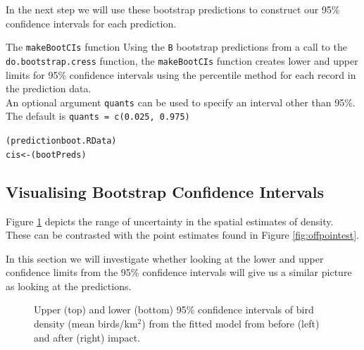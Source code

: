 \noindent In the next step we will use these bootstrap predictions to construct our 95\% confidence intervals for each prediction. 

\begin{block}{The {\tt makeBootCIs} function}
Using the {\tt B} bootstrap predictions from a call to the {\tt do.bootstrap.cress} function, the {\tt makeBootCIs} function  creates lower and upper limits for 95\% confidence intervals using the percentile method for each record in the prediction data. \\

\noindent An optional argument {\tt quants} can be used to specify an interval other than 95\%.  The default is {\tt quants = c(0.025, 0.975)}
\end{block}

\begin{knitrout}\footnotesize
{}\color{fgcolor}\begin{kframe}
\begin{alltt}
(predictionboot.RData)
cis <- (bootPreds)
\end{alltt}
\end{kframe}
\end{knitrout}


\subsection{Visualising Bootstrap Confidence Intervals}
Figure \ref{fig:offcis} depicts the range of uncertainty in the spatial estimates of density.  These can be contrasted with the point estimates found in Figure \ref{fig:offpointest}.

In this section we will investigate whether looking at the lower and upper confidence limits from the 95\% confidence intervals will give us a similar picture as looking at the predictions. 
\begin{figure}[h]
  \centering
  \hfill
  \caption{Upper (top) and lower (bottom) 95\% confidence intervals of bird density (mean birds/km$^2$) from the fitted model from before (left) and after (right) impact.}
  \label{fig:offcis}
\end{figure}

